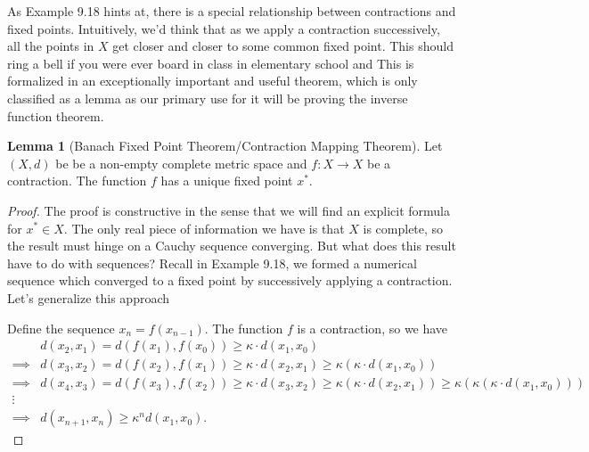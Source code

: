 \documentclass{article}
\theoremstyle{definition}
\newtheorem{lemma}{Lemma}[section]
\begin{document}
	As Example 9.18 hints at, there is a special relationship between contractions and fixed points. Intuitively, we'd think that as we apply a contraction successively, all the points in $ X $ get closer and closer to some common fixed point. This should ring a bell if you were ever board in class in elementary school and This is formalized in an exceptionally important and useful theorem, which is only classified as a lemma as our primary use for it will be proving the inverse function theorem. 
	\begin{lemma}[Banach Fixed Point Theorem/Contraction Mapping Theorem]
		Let $ (X,d) $ be be a non-empty complete metric space and $ f:X\to X $ be a contraction. The function $ f $ has a unique fixed point $ x^*  $. 
	\end{lemma} 
	\begin{proof}
		The proof is constructive in the sense that we will find an explicit formula for $ x^*\in X $. The only real piece of information we have is that $ X $ is complete, so the result must hinge on a Cauchy sequence converging. But what does this result have to do with sequences? Recall in Example 9.18, we formed a numerical sequence which converged to a fixed point by successively applying a contraction. Let's generalize this approach
		
		Define the sequence $  x_n = f(x_{n-1}) $. The function $ f $ is a contraction, so we have 
		\begin{align}
		&  d(x_2, x_1) = d(f(x_1), f(x_0))	\ge \kappa\cdot d(x_1, x_0)\nonumber	\\ \implies &
		d(x_3, x_2) = d(f(x_2), f(x_1))	\ge \kappa\cdot d(x_2, x_1)	\ge \kappa (\kappa\cdot d(x_1, x_0)	)\nonumber\\
		\implies &
		d(x_4, x_3) = d(f(x_3), f(x_2))	\ge \kappa\cdot d(x_3, x_2)	\ge \kappa (\kappa\cdot d(x_2, x_1)	) \ge \kappa(\kappa(\kappa\cdot d(x_1, x_0)))\nonumber\\ \vdots \nonumber\\ \implies &  d(x_{n+1}, x_n) \ge \kappa^nd(x_1,x_0).
		\end{align}
		

\end{proof}
\end{document}
